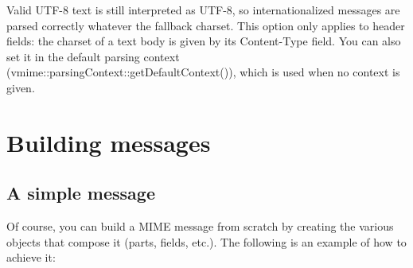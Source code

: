 Valid UTF-8 text is still interpreted as UTF-8, so internationalized messages
are parsed correctly whatever the fallback charset. This option only applies
to header fields: the charset of a text body is given by its
{\vcode Content-Type} field. You can also set it in the default parsing context
({\vcode vmime::parsingContext::getDefaultContext()}), which is used when no
context is given.


\section{Building messages}

\subsection{A simple message\label{msg-building-simple-message}} %

Of course, you can build a MIME message from scratch by creating the various
objects that compose it (parts, fields, etc.). The following is an example of
how to achieve it:

